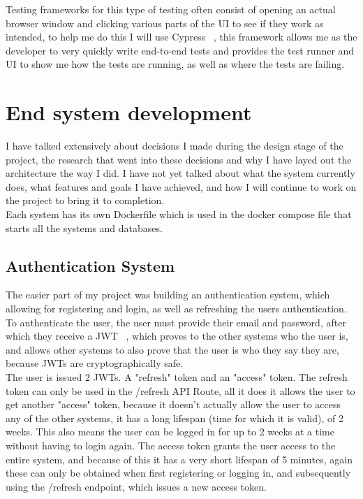\documentclass[titlepage]{article}
\begin{document}
Testing frameworks for this type of testing often consist of opening an actual browser window and clicking various parts of the UI to see if they work as intended, to help me do this I will use Cypress ~\cite{cypress}, this framework allows me as the developer to very quickly write end-to-end tests and provides the test runner and UI to show me how the tests are running, as well as where the tests are failing. 

\section{End system development}
I have talked extensively about decisions I made during the design stage of the project, the research that went into these decisions and why I have layed out the architecture the way I did. I have not yet talked about what the system currently does, what features and goals I have achieved, and how I will continue to work on the project to bring it to completion. \\

Each system has its own Dockerfile which is used in the docker compose file that starts all the systems and databases.

\subsection{Authentication System}
The easier part of my project was building an authentication system, which allowing for registering and login, as well as refreshing the users authentication. To authenticate the user, the user must provide their email and password, after which they receive a JWT ~\cite{jwt}, which proves to the other systems who the user is, and allows other systems to also prove that the user is who they say they are, because JWTs are cryptographically safe. \\

The user is issued 2 JWTs. A "refresh" token and an "access" token. The refresh token can only be used in the /refresh API Route, all it does it allows the user to get another "access" token, because it doesn't actually allow the user to access any of the other systems, it has a long lifespan (time for which it is valid), of 2 weeks. This also means the user can be logged in for up to 2 weeks at a time without having to login again. The access token grants the user access to the entire system, and because of this it has a very short lifespan of 5 minutes, again these can only be obtained when first registering or logging in, and subsequently using the /refresh endpoint, which issues a new access token. \\
\end{document}
